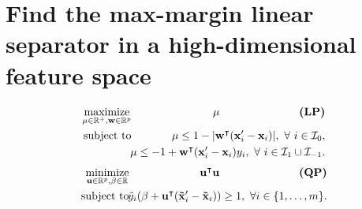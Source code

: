 \documentclass{article}
\newcommand{\RR}{\mathbb R}
\DeclareMathOperator*{\maximize}{maximize}
\DeclareMathOperator*{\minimize}{minimize}
\begin{document}
\section*{Find the max-margin linear separator
  in a high-dimensional feature space}

\begin{minipage}{7in}

\end{minipage}
\begin{minipage}{3in}
   \begin{eqnarray*}
  \maximize_{\mu\in\RR^+, \mathbf w\in\RR^p}\ &&\hskip -0.5cm \mu 
  \hskip 1in \textbf{(LP)} \\
  \text{subject to}\ && \hskip -0.5cm \mu \leq
  1-|\mathbf w^\intercal (\mathbf x_i' - \mathbf x_i)|,\ 
  \forall\  i\in \mathcal I_0,\\
  &&\hskip -0.5cm
  \mu \leq -1 +  \mathbf w^\intercal(\mathbf x_i'-\mathbf x_i)y_i,
  \ \forall\ i\in \mathcal I_1\cup \mathcal I_{-1}.
\end{eqnarray*}
\begin{eqnarray*}
  \minimize_{\mathbf u\in\RR^p, \beta\in\RR}\ &&\hskip -0.5cm
  \mathbf u^\intercal \mathbf u  
  \hskip 1in \textbf{(QP)} \\
\text{subject to}\ &&\hskip -0.5cm 
    \tilde y_i (\beta + 
    \mathbf u^\intercal( \mathbf{\tilde x}_i'-\mathbf{\tilde x}_i) ) \geq 1,
    \ \forall i\in\{1,\dots,m\}.
\end{eqnarray*}
\end{minipage}
\end{document}
